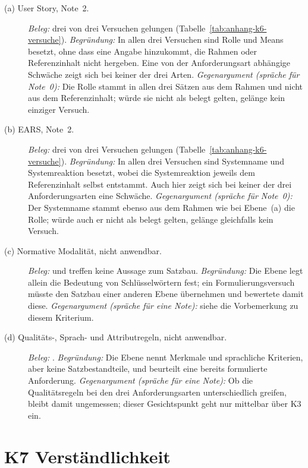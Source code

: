 \documentclass[11pt,a4paper]{report}
\begin{document}
\begin{description}
  \item[(a) User Story, Note~2.]
  \emph{Beleg:} drei von drei Versuchen gelungen
  (Tabelle~\ref{tab:anhang-k6-versuche}).
  \emph{Begründung:} In allen drei Versuchen sind Rolle und Means
  besetzt, ohne dass eine Angabe hinzukommt, die Rahmen oder
  Referenzinhalt nicht hergeben. Eine von der Anforderungsart abhängige
  Schwäche zeigt sich bei keiner der drei Arten.
  \emph{Gegenargument (spräche für Note~0):} Die Rolle stammt in allen
  drei Sätzen aus dem Rahmen und nicht aus dem Referenzinhalt; würde sie
  nicht als belegt gelten, gelänge kein einziger Versuch.

  \item[(b) EARS, Note~2.]
  \emph{Beleg:} drei von drei Versuchen gelungen
  (Tabelle~\ref{tab:anhang-k6-versuche}).
  \emph{Begründung:} In allen drei Versuchen sind Systemname und
  Systemreaktion besetzt, wobei die Systemreaktion jeweils dem
  Referenzinhalt selbst entstammt. Auch hier zeigt sich bei keiner der
  drei Anforderungsarten eine Schwäche.
  \emph{Gegenargument (spräche für Note~0):} Der Systemname stammt
  ebenso aus dem Rahmen wie bei Ebene~(a) die Rolle; würde auch er nicht
  als belegt gelten, gelänge gleichfalls kein Versuch.

  \item[(c) Normative Modalität, nicht anwendbar.]
  \emph{Beleg:} \cite[Abschn.~1--5]{rfc2119} und
  \cite[Abschn.~2]{rfc8174} treffen keine Aussage zum Satzbau.
  \emph{Begründung:} Die Ebene legt allein die Bedeutung von
  Schlüsselwörtern fest; ein Formulierungsversuch müsste den Satzbau
  einer anderen Ebene übernehmen und bewertete damit diese.
  \emph{Gegenargument (spräche für eine Note):} siehe die Vorbemerkung
  zu diesem Kriterium.

  \item[(d) Qualitäts-, Sprach- und Attributregeln, nicht anwendbar.]
  \emph{Beleg:} \cite[Abschn.~5.2.5--5.2.7]{iso29148}.
  \emph{Begründung:} Die Ebene nennt Merkmale und sprachliche Kriterien,
  aber keine Satzbestandteile, und beurteilt eine bereits formulierte
  Anforderung.
  \emph{Gegenargument (spräche für eine Note):} Ob die Qualitätsregeln
  bei den drei Anforderungsarten unterschiedlich greifen, bleibt damit
  ungemessen; dieser Gesichtspunkt geht nur mittelbar über K3 ein.
\end{description}


\section{K7 Verständlichkeit}
\label{sec:anhang-k7}
\end{document}
